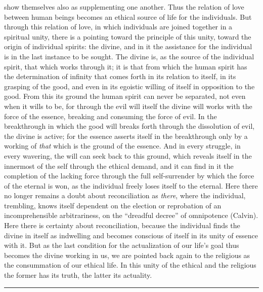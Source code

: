 \documentclass[12pt,a4paper,openany]{book}
\newcommand{\opage}[1]{\marginnote{\footnotesize\textit{[#1]}}}
\begin{document}
show themselves also as supplementing one another. Thus
the relation of love between human beings becomes an ethical
source of life for the individuals. But through this relation of love,
in which individuals are joined together in a spiritual
\opage{507}unity, there is a pointing toward the principle of this unity, toward the origin of individual
spirits: the divine, and in it
the assistance for the individual is in the last instance to be sought. The
divine is, as the source of the individual spirit, that
which works through it; it is that from which
the human spirit has the determination of infinity that
comes forth in its relation to itself, in its grasping of
the good, and even in its egoistic willing of itself in opposition
to the good. From this its ground the human spirit can
never be separated, not even when it wills to be, for through
the evil will itself the divine will works with
the force of the essence, breaking and consuming the force of evil.
In the breakthrough in which the good will breaks forth
through the dissolution of evil, the divine is active;
for the essence asserts itself in the breakthrough only by a
working of \emph{that} which is the ground of the essence. And in every struggle,
in every wavering, the will can seek back to this ground,
which reveals itself in the innermost of the self through the ethical
demand, and it can find in it the completion of
the lacking force through the full self-surrender by
which the force of the eternal is won, as the individual freely loses
itself to the eternal. Here there no longer remains a doubt
about reconciliation as \emph{there}, where the individual, trembling, knows itself
dependent on the election or reprobation of an incomprehensible arbitrariness,
on the ``dreadful decree'' of omnipotence (Calvin).
Here there is certainty about reconciliation, because the individual finds the
divine in itself as indwelling and becomes conscious of itself in its
unity of essence with it. But as the last condition
for the actualization of our life's goal thus becomes the divine
working in us, we are pointed back again to the religious
as the consummation of our ethical life. In this unity of
the ethical and the religious the former has its truth, the latter its
actuality.

\begin{center}\rule{1.8cm}{0.4pt}\end{center}
\end{document}
